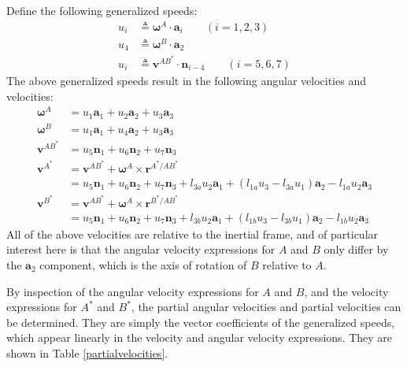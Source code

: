 \documentclass[letterpaper,11pt]{article}
\newcommand{\bs}[1]{ \boldsymbol{ #1 } }
\begin{document}
Define the following generalized speeds:
\begin{align}
  u_i & \triangleq \bs{\omega}^A \cdot \bs{a}_i  \qquad  (i = 1,2,3) \label{u_defs1} \\
  u_4 & \triangleq \bs{\omega}^B \cdot \bs{a}_2 \label{u_defs2} \\
  u_i & \triangleq \bs{v}^{AB^*} \cdot \bs{n}_{i-4} \qquad  (i = 5,6,7) \label{u_defs3}
\end{align}
The above generalized speeds result in the following angular velocities and
velocities:
\begin{align*}
  \bs{\omega}^A & = u_1 \bs{a}_1 + u_2 \bs{a}_2 + u_3 \bs{a}_3 \\
  \bs{\omega}^B & = u_1 \bs{a}_1 + u_4 \bs{a}_2 + u_3 \bs{a}_3 \\
  \bs{v}^{AB^*} & = u_5 \bs{n}_1 + u_6 \bs{n}_2 + u_7 \bs{n}_3 \\
  \bs{v}^{A^*}  & = \bs{v}^{AB^*} + \bs{\omega}^A \times \bs{r}^{A^*/AB^*} \\
  & = u_5 \bs{n}_1 + u_6 \bs{n}_2 + u_7 \bs{n}_3 +l_{3a}u_2\bs{a}_1 +
  (l_{1a}u_3 - l_{3a}u_1)\bs{a}_2 - l_{1a}u_2\bs{a}_3 \\
  \bs{v}^{B^*}  & = \bs{v}^{AB^*} + \bs{\omega}^A \times \bs{r}^{B^*/AB^*} \\
  & = u_5 \bs{n}_1 + u_6 \bs{n}_2 + u_7 \bs{n}_3 +l_{3b}u_2\bs{a}_1 +
  (l_{1b}u_3 - l_{3b}u_1)\bs{a}_2 - l_{1b}u_2\bs{a}_3
\end{align*}
All of the above velocities are relative to the inertial frame, and of particular
interest here is that the angular velocity expressions for $A$ and $B$ only
differ by the $\bs{a}_2$ component, which is the axis of rotation of $B$
relative to $A$.

By inspection of the angular velocity expressions for $A$ and $B$, and the
velocity expressions for $A^*$ and $B^*$, the partial angular velocities and
partial velocities can be determined.  They are simply the vector coefficients
of the generalized speeds, which appear linearly in the velocity and angular
velocity expressions.  They are shown in Table \ref{partialvelocities}.
\end{document}
